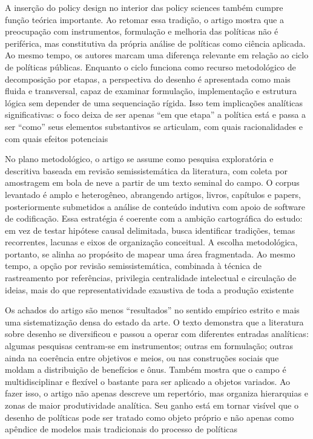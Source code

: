 \documentclass[12pt,a4paper]{article}
\begin{document}
A inserção do policy design no interior das policy sciences também cumpre função teórica importante. Ao retomar essa tradição, o artigo mostra que a preocupação com instrumentos, formulação e melhoria das políticas não é periférica, mas constitutiva da própria análise de políticas como ciência aplicada. Ao mesmo tempo, os autores marcam uma diferença relevante em relação ao ciclo de políticas públicas. Enquanto o ciclo funciona como recurso metodológico de decomposição por etapas, a perspectiva do desenho é apresentada como mais fluida e transversal, capaz de examinar formulação, implementação e estrutura lógica sem depender de uma sequenciação rígida. Isso tem implicações analíticas significativas: o foco deixa de ser apenas “em que etapa” a política está e passa a ser “como” seus elementos substantivos se articulam, com quais racionalidades e com quais efeitos potenciais \parencite{lima2021_conectando_problemas}

No plano metodológico, o artigo se assume como pesquisa exploratória e descritiva baseada em revisão semissistemática da literatura, com coleta por amostragem em bola de neve a partir de um texto seminal do campo. O corpus levantado é amplo e heterogêneo, abrangendo artigos, livros, capítulos e papers, posteriormente submetidos a análise de conteúdo indutiva com apoio de software de codificação. Essa estratégia é coerente com a ambição cartográfica do estudo: em vez de testar hipótese causal delimitada, busca identificar tradições, temas recorrentes, lacunas e eixos de organização conceitual. A escolha metodológica, portanto, se alinha ao propósito de mapear uma área fragmentada. Ao mesmo tempo, a opção por revisão semissistemática, combinada à técnica de rastreamento por referências, privilegia centralidade intelectual e circulação de ideias, mais do que representatividade exaustiva de toda a produção existente \parencite{lima2021_conectando_problemas}

Os achados do artigo são menos “resultados” no sentido empírico estrito e mais uma sistematização densa do estado da arte. O texto demonstra que a literatura sobre desenho se diversificou e passou a operar com diferentes entradas analíticas: algumas pesquisas centram-se em instrumentos; outras em formulação; outras ainda na coerência entre objetivos e meios, ou nas construções sociais que moldam a distribuição de benefícios e ônus. Também mostra que o campo é multidisciplinar e flexível o bastante para ser aplicado a objetos variados. Ao fazer isso, o artigo não apenas descreve um repertório, mas organiza hierarquias e zonas de maior produtividade analítica. Seu ganho está em tornar visível que o desenho de políticas pode ser tratado como objeto próprio e não apenas como apêndice de modelos mais tradicionais do processo de políticas \parencite{lima2021_conectando_problemas}
\end{document}
